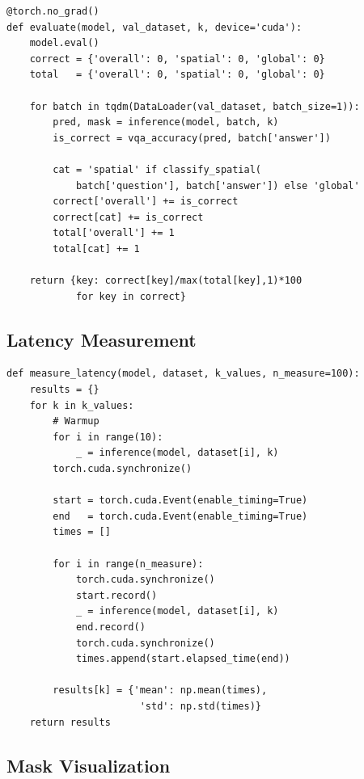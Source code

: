 \documentclass[11pt,a4paper]{article}
\begin{document}
\begin{lstlisting}[caption={Evaluation with spatial stratification.}]
@torch.no_grad()
def evaluate(model, val_dataset, k, device='cuda'):
    model.eval()
    correct = {'overall': 0, 'spatial': 0, 'global': 0}
    total   = {'overall': 0, 'spatial': 0, 'global': 0}

    for batch in tqdm(DataLoader(val_dataset, batch_size=1)):
        pred, mask = inference(model, batch, k)
        is_correct = vqa_accuracy(pred, batch['answer'])

        cat = 'spatial' if classify_spatial(
            batch['question'], batch['answer']) else 'global'
        correct['overall'] += is_correct
        correct[cat] += is_correct
        total['overall'] += 1
        total[cat] += 1

    return {key: correct[key]/max(total[key],1)*100
            for key in correct}
\end{lstlisting}

\subsection{Latency Measurement}

\begin{lstlisting}[caption={GPU-accurate latency measurement.}]
def measure_latency(model, dataset, k_values, n_measure=100):
    results = {}
    for k in k_values:
        # Warmup
        for i in range(10):
            _ = inference(model, dataset[i], k)
        torch.cuda.synchronize()

        start = torch.cuda.Event(enable_timing=True)
        end   = torch.cuda.Event(enable_timing=True)
        times = []

        for i in range(n_measure):
            torch.cuda.synchronize()
            start.record()
            _ = inference(model, dataset[i], k)
            end.record()
            torch.cuda.synchronize()
            times.append(start.elapsed_time(end))

        results[k] = {'mean': np.mean(times),
                       'std': np.std(times)}
    return results
\end{lstlisting}

\subsection{Mask Visualization}
\end{document}
